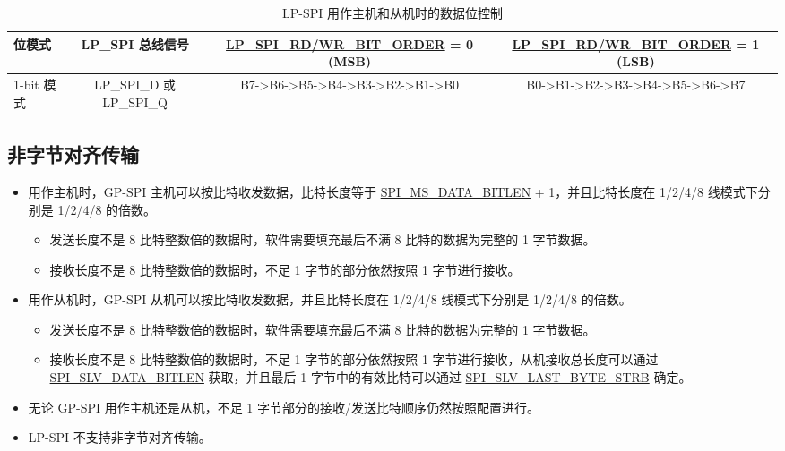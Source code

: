 \documentclass[main\_\_CN.tex]{subfiles}
\begin{document}
\begin{landscape}
\begin{footnotesize}
\begin{longtable}[c]{ |l|c|c|c|c|c| }
\end{longtable}

\begin{longtable}[c]{ |l|c|c|c| }
\caption{LP-SPI 用作主机和从机时的数据位控制}
\label{tab:lp-spi-bit-order-control}\\\hline
\rowcolor{lightgray}      
    \textbf{位模式}    & \textbf{LP\_SPI 总线信号}  & \hyperref[fielddesc:LPSPIRDBITORDER]{LP\_SPI\_RD/WR\_BIT\_ORDER} = 0 (MSB)& \hyperref[fielddesc:LPSPIRDBITORDER]{LP\_SPI\_RD/WR\_BIT\_ORDER} = 1 (LSB) \\
    \hline
\endhead

    1-bit 模式  & LP\_SPI\_D 或 LP\_SPI\_Q & B7->B6->B5->B4->B3->B2->B1->B0 & B0->B1->B2->B3->B4->B5->B6->B7 \\
    \hline
\end{longtable}
\end{footnotesize}
\end{landscape}

\subsection{非字节对齐传输}
\label{sec:unaligned-byte-transfer}

\begin{itemize}
    \item 用作主机时，GP-SPI 主机可以按比特收发数据，比特长度等于 \hyperref[fielddesc:SPIMSDATABITLEN]{SPI\_MS\_DATA\_BITLEN} + 1，并且比特长度在 1/2/4/8 线模式下分别是 1/2/4/8 的倍数。
    \begin{itemize}
        \item 发送长度不是 8 比特整数倍的数据时，软件需要填充最后不满 8 比特的数据为完整的 1 字节数据。
        \item 接收长度不是 8 比特整数倍的数据时，不足 1 字节的部分依然按照 1 字节进行接收。
    \end{itemize}
    \item 用作从机时，GP-SPI 从机可以按比特收发数据，并且比特长度在 1/2/4/8 线模式下分别是 1/2/4/8 的倍数。
    \begin{itemize}
        \item 发送长度不是 8 比特整数倍的数据时，软件需要填充最后不满 8 比特的数据为完整的 1 字节数据。
        \item 接收长度不是 8 比特整数倍的数据时，不足 1 字节的部分依然按照 1 字节进行接收，从机接收总长度可以通过 \hyperref[fielddesc:SPISLVDATABITLEN]{SPI\_SLV\_DATA\_BITLEN} 获取，并且最后 1 字节中的有效比特可以通过 \hyperref[fielddesc:SPISLVLASTBYTESTRB]{SPI\_SLV\_LAST\_BYTE\_STRB} 确定。
    \end{itemize}
\end{itemize}
\begin{tiplisting}
\vspace{-2em}
\begin{itemize}
    \item 无论 GP-SPI 用作主机还是从机，不足 1 字节部分的接收/发送比特顺序仍然按照配置进行。
    \item LP-SPI 不支持非字节对齐传输。
\end{itemize}
\end{tiplisting}
\end{document}
